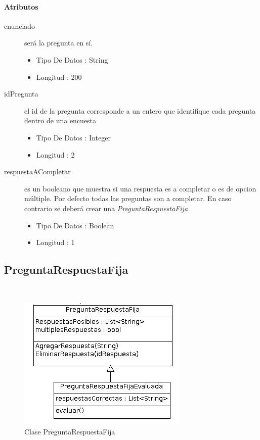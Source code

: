 \documentclass{article}
\begin{document}
\paragraph{\large{Atributos}}
\begin{description}


\item[enunciado] ser\'a la pregunta en s\'i.
\begin{itemize}
\item Tipo De Datos : String
\item Longitud : 200
\end{itemize}
\item[idPregunta]  el id de la pregunta corresponde a un entero que identifique cada pregunta dentro de una encuesta
\begin{itemize}
\item Tipo De Datos : Integer
\item Longitud : 2
\end{itemize}
\item[respuestaACompletar] es un booleano que muestra si una respuesta es a completar o es de opcion m\'ultiple. Por defecto todas las preguntas son a completar. En caso contrario se deber\'a crear una \textit{PreguntaRespuestaFija}
\begin{itemize}
\item Tipo De Datos : Boolean
\item Longitud : 1
\end{itemize}
\end{description}
\subsection{PreguntaRespuestaFija} \



\begin{figure}[h]
\centering
\includegraphics[scale=0.9]{RespuestaFija}

\caption{Clase PreguntaRespuestaFija}
\end{figure}
\end{document}
